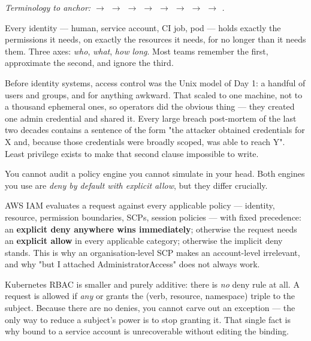 \begin{center}\small\itshape\color{cInk!70}
Terminology to anchor:  $\rightarrow$  $\rightarrow$  $\rightarrow$  $\rightarrow$  $\rightarrow$  $\rightarrow$  $\rightarrow$  $\rightarrow$ .
\end{center}



 Every identity --- human, service account, CI job, pod --- holds exactly the permissions it needs, on exactly the resources it needs, for no longer than it needs them. Three axes: \emph{who}, \emph{what}, \emph{how long}. Most teams remember the first, approximate the second, and ignore the third.

 Before identity systems, access control was the Unix model of Day 1: a handful of users and groups, and  for anything awkward. That scaled to one machine, not to a thousand ephemeral ones, so operators did the obvious thing --- they created one admin credential and shared it. Every large breach post-mortem of the last two decades contains a sentence of the form "the attacker obtained credentials for X and, because those credentials were broadly scoped, was able to reach Y". Least privilege exists to make that second clause impossible to write.

 You cannot audit a policy engine you cannot simulate in your head. Both engines you use are \emph{deny by default with explicit allow}, but they differ crucially.

AWS IAM evaluates a request against every applicable policy --- identity, resource, permission boundaries, SCPs, session policies --- with fixed precedence: an \textbf{explicit deny anywhere wins immediately}; otherwise the request needs an \textbf{explicit allow} in every applicable category; otherwise the implicit deny stands. This is why an organisation-level SCP makes an account-level  irrelevant, and why "but I attached AdministratorAccess" does not always work.

Kubernetes RBAC is smaller and purely additive: there is \emph{no} deny rule at all. A request is allowed if \emph{any}  or  grants the (verb, resource, namespace) triple to the subject. Because there are no denies, you cannot carve out an exception --- the only way to reduce a subject's power is to stop granting it. That single fact is why  bound to a service account is unrecoverable without editing the binding.

